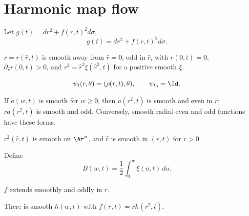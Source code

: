 \section{Harmonic map flow}
Let $g(t)=dr^2+f(r,t)^2d\sigma$,
\begin{equation}\label{eq2.4}g(t)=dr^2+f(r,t)^2d\sigma.\end{equation}

\begin{claim}
\label{claim:radial-coordinate-properties}
\label{cl12.20}
$r=r(\hat r,t)$ is smooth away from $\hat r=0$, odd in $\hat r$, with
$r(0,t)=0$, $\partial_{\hat r}r(0,t)>0$, and
$r^2=\hat r^2\xi(\hat r^2,t)$ for a positive smooth $\xi$.
\end{claim}

\begin{equation}\label{ansatz}
\psi_t(r,\theta)=(\rho(r,t),\theta),\qquad\psi_{t_0}=\Id.
\end{equation}

\begin{lemma}
\label{lem:even-odd-radial-functions}
If $a(w,t)$ is smooth for $w\ge0$, then $a(r^2,t)$ is smooth and even
in $r$; $r a(r^2,t)$ is smooth and odd. Conversely, smooth radial even
and odd functions have these forms.
\end{lemma}

\begin{corollary}
\label{cor:r-squared-smooth-function}
\label{rcor}
$r^2(\hat r,t)$ is smooth on $\Ar^n$, and $\hat r$ is smooth in $(r,t)$
for $r>0$.
\end{corollary}
Define
\begin{equation}\label{Bdefn}B(w,t)=\frac12\int_0^w\xi(u,t)\,du.\end{equation}

\begin{claim}
\label{claim:f-odd-smooth-function}
$f$ extends smoothly and oddly in $r$.
\end{claim}
\begin{corollary}[Factorization $f(r,t)=r\,h(r^2,t)$]
\label{cor:f-factorization-rh}
There is smooth $h(w,t)$ with $f(r,t)=rh(r^2,t)$.
\end{corollary}

